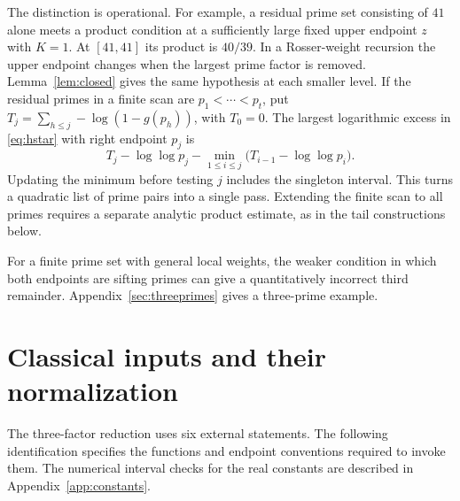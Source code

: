 \documentclass[11pt]{article}
\theoremstyle{remark}\newtheorem{remark}[theorem]{Remark}
\begin{document}
The distinction is operational. For example, a residual prime set
consisting of $41$ alone meets a product condition at a sufficiently
large fixed upper endpoint $z$ with $K=1$. At $[41,41]$ its product is
$40/39$. In a Rosser-weight recursion the upper endpoint changes when
the largest prime factor is removed. Lemma~\ref{lem:closed} gives the
same hypothesis at each smaller level. If the residual primes in a finite
scan are $p_1<\cdots<p_t$, put
$T_j=\sum_{h\le j}-\log(1-g(p_h))$, with $T_0=0$. The largest
logarithmic excess in \eqref{eq:hstar} with right endpoint $p_j$ is
\[
 T_j-\log\log p_j
       -\min_{1\le i\le j}\bigl(T_{i-1}-\log\log p_i\bigr).
\]
Updating the minimum before testing $j$ includes the singleton interval.
This turns a quadratic list of prime pairs into a single pass. Extending
the finite scan to all primes requires a separate analytic product
estimate, as in the tail constructions below.

For a finite prime set with general local weights, the weaker condition in which both endpoints are sifting primes can give a quantitatively incorrect third remainder. Appendix~\ref{sec:threeprimes} gives a three-prime example.

\section{Classical inputs and their normalization}\label{sec:inputs}

The three-factor reduction uses six external statements. The following identification specifies the functions and endpoint conventions required to invoke them. The numerical interval checks for the real constants are described in Appendix~\ref{app:constants}.
\end{document}
